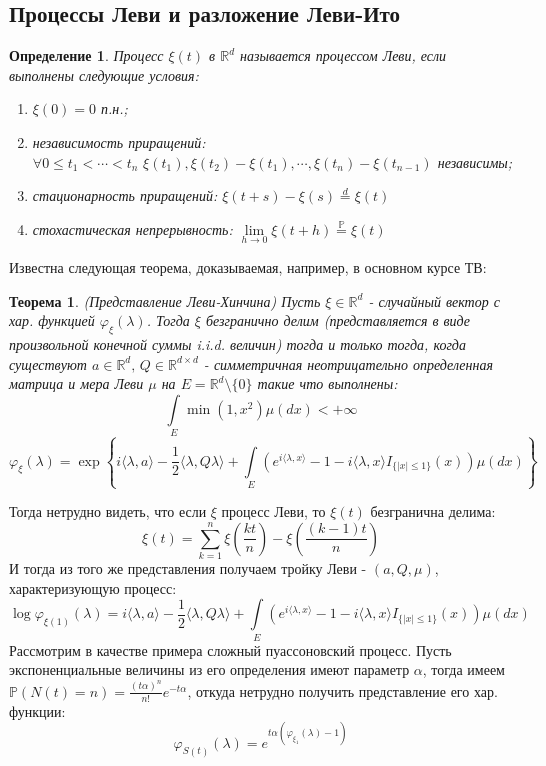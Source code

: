 \documentclass[12pt,a4paper]{article} %
\newtheorem{theorem}{Теорема}
\newtheorem{definition}{Определение}
\newcommand{\R}{\mathbb{R}}
\newcommand{\PR}{\mathbb{P}}
\newcommand{\charf}[2][\lambda]{\varphi_{#2}(#1)}
\begin{document}
	\subsection{Процессы Леви и разложение Леви-Ито}
	\begin{definition}
		Процесс $\xi(t)$ в $\R^d$ называется процессом Леви, если выполнены следующие условия:
		\begin{enumerate}
			\item $\xi(0)=0$ п.н.;
			\item независимость приращений: $\forall0\leq t_1<\cdots<t_n\,\,\xi(t_1),\xi(t_2)-\xi(t_1),\cdots,\xi(t_n)-\xi(t_{n-1})$ независимы;
			\item стационарность приращений: $\xi(t+s)-\xi(s)\overset{d}{=}\xi(t)$
			\item стохастическая непрерывность: $\lim\limits_{h\rightarrow0}\xi(t+h)\overset{\PR}{=}\xi(t)$
		\end{enumerate}
	\end{definition}
	Известна следующая теорема, доказываемая, например, в основном курсе ТВ:
	\begin{theorem}
		(Представление Леви-Хинчина) Пусть $\xi\in\R^d$ - случайный вектор с хар. функцией $\charf{\xi}$. Тогда $\xi$ безгранично делим (представляется в виде произвольной конечной суммы i.i.d. величин) тогда и только тогда, когда существуют $a\in\R^d,\,Q\in\R^{d\times d}$ - симметричная неотрицательно определенная матрица и мера Леви $\mu$ на $E=\R^d\setminus\{0\}$ такие что выполнены:
		$$\int\limits_E\min(1,x^2)\mu(dx)<+\infty$$
		$$\charf{\xi}=\exp\left\{i\langle\lambda,a\rangle-\frac{1}{2}\langle\lambda,Q\lambda\rangle+\int\limits_E(e^{i\langle\lambda,x\rangle}-1-i\langle\lambda,x\rangle I_{\{|x|\leq1\}}(x))\mu(dx)\right\}$$
	\end{theorem}
	Тогда нетрудно видеть, что если $\xi$ процесс Леви, то $\xi(t)$ безгранична делима:
	$$\xi(t)=\sum_{k=1}^n\xi\left(\frac{kt}{n}\right)-\xi\left(\frac{(k-1)t}{n}\right)$$
	И тогда из того же представления получаем тройку Леви - $(a,Q,\mu)$, характеризующую процесс:
	$$\log\charf{\xi(1)}=i\langle\lambda,a\rangle-\frac{1}{2}\langle\lambda,Q\lambda\rangle+\int\limits_E(e^{i\langle\lambda,x\rangle}-1-i\langle\lambda,x\rangle I_{\{|x|\leq1\}}(x))\mu(dx)$$
	Рассмотрим в качестве примера сложный пуассоновский процесс. Пусть экспоненциальные величины из его определения имеют параметр $\alpha$, тогда имеем $\PR(N(t)=n)=\frac{(t\alpha)^n}{n!}e^{-t\alpha}$, откуда нетрудно получить представление его хар. функции:
	$$\charf{S(t)}=e^{t\alpha(\charf{\xi_1}-1)}$$
\end{document}
